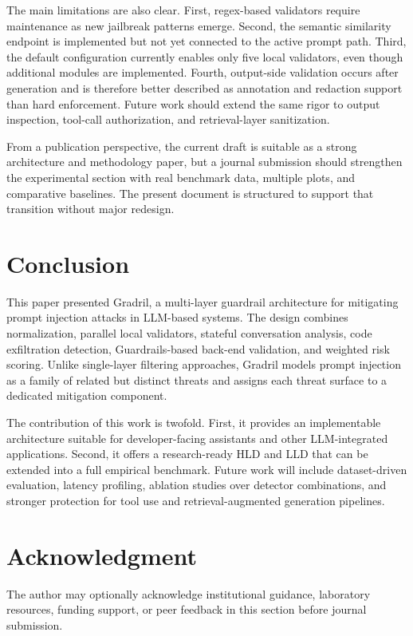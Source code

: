 \documentclass[journal]{IEEEtran}
\begin{document}
The main limitations are also clear. First, regex-based validators require maintenance as new jailbreak patterns emerge. Second, the semantic similarity endpoint is implemented but not yet connected to the active prompt path. Third, the default configuration currently enables only five local validators, even though additional modules are implemented. Fourth, output-side validation occurs after generation and is therefore better described as annotation and redaction support than hard enforcement. Future work should extend the same rigor to output inspection, tool-call authorization, and retrieval-layer sanitization.

From a publication perspective, the current draft is suitable as a strong architecture and methodology paper, but a journal submission should strengthen the experimental section with real benchmark data, multiple plots, and comparative baselines. The present document is structured to support that transition without major redesign.

\section{Conclusion}
This paper presented Gradril, a multi-layer guardrail architecture for mitigating prompt injection attacks in LLM-based systems. The design combines normalization, parallel local validators, stateful conversation analysis, code exfiltration detection, Guardrails-based back-end validation, and weighted risk scoring. Unlike single-layer filtering approaches, Gradril models prompt injection as a family of related but distinct threats and assigns each threat surface to a dedicated mitigation component.

The contribution of this work is twofold. First, it provides an implementable architecture suitable for developer-facing assistants and other LLM-integrated applications. Second, it offers a research-ready HLD and LLD that can be extended into a full empirical benchmark. Future work will include dataset-driven evaluation, latency profiling, ablation studies over detector combinations, and stronger protection for tool use and retrieval-augmented generation pipelines.

\section*{Acknowledgment}
The author may optionally acknowledge institutional guidance, laboratory resources, funding support, or peer feedback in this section before journal submission.
\end{document}
